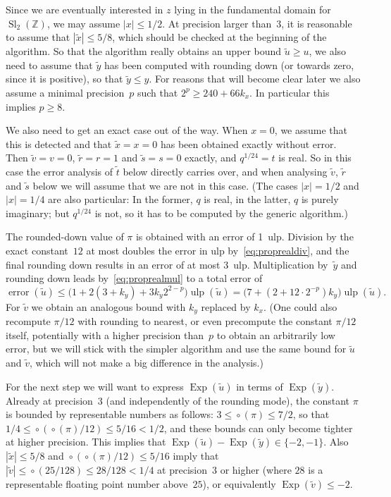 \documentclass [11pt]{article}
\newcommand {\appro}[1]{\widetilde {#1}}
\newcommand {\ulp}[1]{#1~ulp}
\newcommand {\Ulp}{{\operatorname {ulp}}}
\DeclareMathOperator{\Exp}{\operatorname {Exp}}
\newcommand{\error}{\operatorname {error}}
\newcommand {\round}{\operatorname {\circ}}
\newcommand {\Z}{\mathbb Z}
\renewcommand {\leq}{\leqslant}
\renewcommand {\geq}{\geqslant}
\newcommand {\Sl}{\operatorname{Sl}}
\begin{document}
Since we are eventually interested in $z$ lying in the fundamental domain
for $\Sl_2 (\Z)$, we may assume $|x| \leq 1/2$.
At precision larger than~$3$, it is reasonable to assume that
$|\appro x| \leq 5/8$, which should be checked at the beginning of the
algorithm.
So that the algorithm really obtains an upper bound
$\appro u \geq u$, we also need to assume that $\appro y$ has been
computed with rounding down (or towards zero, since it is positive),
so that $\appro y \leq y$.
For reasons that will become clear later we also assume a minimal
precision~$p$ such that $2^p \geq 240 + 66 k_x$.
In particular this implies $p \geq 8$.

We also need to get an exact case out of the way.
When $x = 0$, we assume that this is detected and that $\appro x = x = 0$
has been obtained exactly without error.
Then $\appro v = v = 0$, $\appro r = r = 1$ and $\appro s = s = 0$
exactly, and $q^{1/24} = t$ is real.
So in this case the error analysis of $\appro t$ below directly carries
over, and when analysing $\appro v$, $\appro r$ and $\appro s$ below
we will assume that we are not in this case.
(The cases $|x| = 1/2$ and $|x| = 1/4$ are also particular: In the former,
$q$ is real, in the latter, $q$ is purely imaginary; but
$q^{1/24}$ is not, so it has to be computed by the generic algorithm.)

The rounded-down value of $\pi$ is obtained with an error of \ulp{1}.
Division by the exact constant~$12$ at most doubles the error in ulp
by~\eqref {eq:proprealdiv}, and the final rounding down results in an
error of at most \ulp{3}. Multiplication by~$\appro y$ and rounding down
leads by~\eqref {eq:proprealmul} to a total error of
\[
\error (\appro u)
\leq \big( 1 + 2 (3 + k_y) + 3 k_y 2^{2-p} \big) \Ulp (\appro u)
=    \big( 7 + (2 + 12 \cdot 2^{-p}) k_y \big) \Ulp (\appro u).
\]
For $\appro v$ we obtain an analogous bound with $k_y$ replaced by $k_x$.
(One could also recompute $\pi / 12$ with rounding to nearest,
or even precompute the constant $\pi / 12$ itself, potentially
with a higher precision than~$p$ to obtain an arbitrarily low error,
but we will stick with the simpler algorithm and use the same bound
for $\appro u$ and $\appro v$, which will not make a big difference in
the analysis.)

For the next step we will want to express $\Exp (\appro u)$ in terms of
$\Exp (\appro y)$. Already at precision~$3$ (and independently of the
rounding mode), the constant $\pi$ is bounded by representable numbers
as follows:
$3 \leq \round (\pi) \leq 7/2$, so that
$1/4 \leq \round (\round (\pi) / 12) \leq 5/16 < 1/2$,
and these bounds can only become tighter at higher precision.
This implies that
$\Exp (\appro u) - \Exp (\appro y) \in \{ -2, -1 \}$.
Also $|\appro x| \leq 5/8$ and $\round (\round (\pi) / 12) \leq 5/16$
imply that $|\appro v| \leq \round (25/128) \leq 28/128 < 1/4$
at precision~$3$ or higher (where $28$ is a representable floating point
number above~$25$), or equivalently $\Exp (\appro v) \leq -2$.
\end{document}
